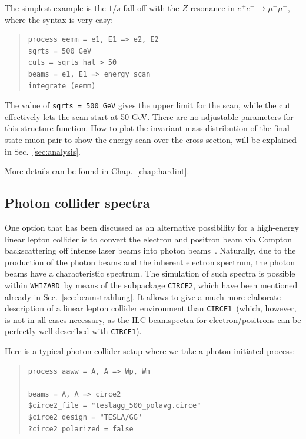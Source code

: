 \documentclass[12pt]{book}
\newcommand{\ttt}[1]{\texttt{#1}}
\newcommand{\whizard}{\ttt{WHIZARD}}
\newcommand{\circeone}{\ttt{CIRCE1}}
\newcommand{\circetwo}{\ttt{CIRCE2}}
\begin{document}
The simplest example is the $1/s$ fall-off with the $Z$ resonance in
$e^+e^- \to \mu^+ \mu^-$, where the syntax is very easy:
\begin{quote}
\begin{footnotesize}
\begin{Verbatim}
process eemm = e1, E1 => e2, E2
sqrts = 500 GeV
cuts = sqrts_hat > 50
beams = e1, E1 => energy_scan
integrate (eemm)
\end{Verbatim}
\end{footnotesize}
\end{quote}
The value of \ttt{sqrts = 500 GeV} gives the upper limit for the scan,
while the cut effectively lets the scan start at 50 GeV. There are no
adjustable parameters for this structure function. How to plot the
invariant mass distribution of the final-state muon pair to show the
energy scan over the cross section, will be explained in
Sec.~\ref{sec:analysis}.

More details can be found in Chap.~\ref{chap:hardint}.


\subsection{Photon collider spectra}
\label{sec:photoncoll}

One option that has been discussed as an alternative possibility for a
high-energy linear lepton collider is to convert the electron and
positron beam via Compton backscattering off intense laser beams into
photon
beams~\cite{Ginzburg:1981vm,Telnov:1989sd,Telnov:1995hc}. Naturally,
due to the production
of the photon beams and the inherent electron spectrum, the photon
beams have a characteristic spectrum. The simulation of such spectra
is possible within \whizard\ by means of the subpackage \circetwo,
which have been mentioned already in Sec.~\ref{sec:beamstrahlung}. It
allows to give a much more elaborate description of a linear lepton
collider environment than
\circeone\ (which, however, is not in all cases necessary, as the ILC
beamspectra for electron/positrons can be perfectly well described
with \circeone).

Here is a typical photon collider setup where we take a
photon-initiated process:
\begin{quote}
\begin{footnotesize}
\begin{Verbatim}
process aaww = A, A => Wp, Wm

beams = A, A => circe2
$circe2_file = "teslagg_500_polavg.circe"
$circe2_design = "TESLA/GG"
?circe2_polarized = false
\end{Verbatim}
\end{footnotesize}%
\end{quote}
\end{document}
